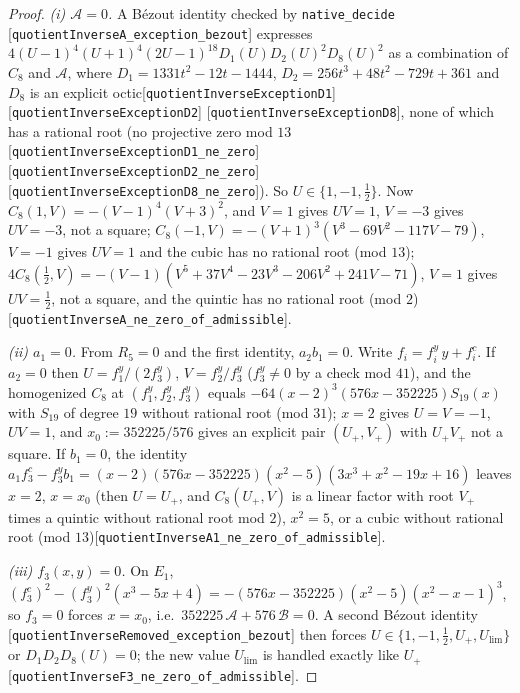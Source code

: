 \documentclass[10pt]{article}
\theoremstyle{definition}
\theoremstyle{remark}
\newcommand{\leanref}[1]{{\scriptsize\textup{[\texttt{#1}]}}\allowbreak}
\begin{document}
\begin{proof}
\emph{(i) $\mathcal{A}=0$.}  A B\'ezout identity checked by \texttt{native\_\allowbreak decide}
\leanref{quotient\allowbreak Inverse\allowbreak A\_\allowbreak exception\_\allowbreak bezout} expresses
$4(U-1)^4(U+1)^4(2U-1)^{18}D_1(U)D_2(U)^2D_8(U)^2$ as a combination of $C_8$
and $\mathcal{A}$, where $D_1=1331t^2-12t-1444$, $D_2=256t^3+48t^2-729t+361$
and $D_8$ is an explicit octic\leanref{quotient\allowbreak Inverse\allowbreak Exception\allowbreak D1} \leanref{quotient\allowbreak Inverse\allowbreak Exception\allowbreak D2} \leanref{quotient\allowbreak Inverse\allowbreak Exception\allowbreak D8},
none of which has a rational root (no projective zero mod $13$
\leanref{quotient\allowbreak Inverse\allowbreak Exception\allowbreak D1\_\allowbreak ne\_\allowbreak zero} \leanref{quotient\allowbreak Inverse\allowbreak Exception\allowbreak D2\_\allowbreak ne\_\allowbreak zero} \leanref{quotient\allowbreak Inverse\allowbreak Exception\allowbreak D8\_\allowbreak ne\_\allowbreak zero}).
So $U\in\{1,-1,\tfrac12\}$.  Now $C_8(1,V)=-(V-1)^4(V+3)^2$, and $V=1$ gives
$UV=1$, $V=-3$ gives $UV=-3$, not a square;
$C_8(-1,V)=-(V+1)^3(V^3-69V^2-117V-79)$, $V=-1$ gives $UV=1$ and the cubic has
no rational root (mod $13$);
$4C_8(\tfrac12,V)=-(V-1)(V^5+37V^4-23V^3-206V^2+241V-71)$, $V=1$ gives
$UV=\tfrac12$, not a square, and the quintic has no rational root (mod $2$)
\leanref{quotient\allowbreak Inverse\allowbreak A\_\allowbreak ne\_\allowbreak zero\_\allowbreak of\_\allowbreak admissible}.

\emph{(ii) $a_1=0$.}  From $R_5=0$ and the first identity, $a_2b_1=0$.
Write $f_i=f_i^y\,y+f_i^c$.  If $a_2=0$ then $U=f_1^{y}/(2f_3^{y})$,
$V=f_2^{y}/f_3^{y}$ ($f_3^y\ne0$ by a check mod $41$), and the homogenized
$C_8$ at $(f_1^y,f_2^y,f_3^y)$ equals $-64(x-2)^3(576x-352225)S_{19}(x)$ with
$S_{19}$ of degree $19$ without rational root (mod $31$); $x=2$ gives
$U=V=-1$, $UV=1$, and $x_0:=352225/576$ gives an explicit pair $(U_+,V_+)$
with $U_+V_+$ not a square.  If $b_1=0$, the identity
$a_1f_3^{c}-f_3^{y}b_1=(x-2)(576x-352225)(x^2-5)(3x^3+x^2-19x+16)$ leaves
$x=2$, $x=x_0$ (then $U=U_+$, and $C_8(U_+,V)$ is a linear factor with root
$V_+$ times a quintic without rational root mod $2$), $x^2=5$, or a cubic
without rational root (mod $13$)\leanref{quotient\allowbreak Inverse\allowbreak A1\_\allowbreak ne\_\allowbreak zero\_\allowbreak of\_\allowbreak admissible}.

\emph{(iii) $f_3(x,y)=0$.}  On $E_1$, $(f_3^c)^2-(f_3^y)^2(x^3-5x+4)
=-(576x-352225)(x^2-5)(x^2-x-1)^3$, so $f_3=0$ forces $x=x_0$, i.e.\
$352225\,\mathcal{A}+576\,\mathcal{B}=0$.  A second B\'ezout identity
\leanref{quotient\allowbreak Inverse\allowbreak Removed\_\allowbreak exception\_\allowbreak bezout} then forces
$U\in\{1,-1,\tfrac12,U_+,U_{\lim}\}$ or $D_1D_2D_8(U)=0$; the new value
$U_{\lim}$ is handled exactly like $U_+$
\leanref{quotient\allowbreak Inverse\allowbreak F3\_\allowbreak ne\_\allowbreak zero\_\allowbreak of\_\allowbreak admissible}.
\end{proof}
\end{document}
